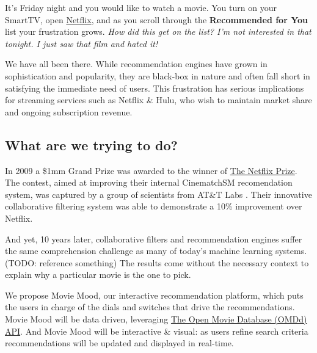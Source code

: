 It's Friday night and you would like to watch a movie.  You turn on your SmartTV, open \href{http://www.netflix.com}{Netflix}, and as you scroll through the \textbf{Recommended for You} list your frustration grows.   \textit{How did this get on the list?  I'm not interested in that tonight.  I just saw that film and hated it!}  

We have all been there.   While recommendation engines have grown in sophistication and popularity, they are black-box in nature and often fall short in satisfying the immediate need of users. This frustration has serious implications for streaming services such as Netflix \& Hulu, who wish to maintain market share and ongoing subscription revenue.  

\subsection{What are we trying to do?}

In 2009 a \$1mm Grand Prize was awarded to the winner of \href{https://www.netflixprize.com/}{The Netflix Prize}.  The contest, aimed at improving their internal CinematchSM recomendation system, was captured by a group of scientists from AT\&T Labs \cite{@koren09}.  Their innovative collaborative filtering system was able to demonstrate a 10\% improvement over Netflix.

And yet, 10 years later, collaborative filters and recommendation engines suffer the same comprehension challenge as many of today's machine learning systems.  (TODO: reference something) The results come without the necessary context to explain why a particular movie is the one to pick.

We propose Movie Mood, our interactive recommendation platform, which puts the users in charge of the dials and switches that drive the recommendations.   Movie Mood will be data driven, leveraging  \href{https://www.omdbapi.com/}{The Open Movie Database (OMDd) API}.   And Movie Mood will be interactive \& visual: as users refine search criteria recommendations will be updated and displayed in real-time.



